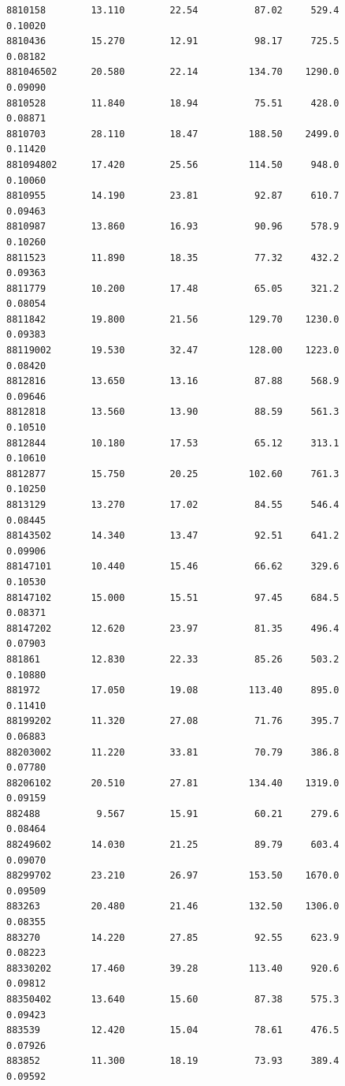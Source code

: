 \documentclass[
  letterpaper,
  DIV=11,
  numbers=noendperiod]{scrartcl}
\begin{document}
\begin{verbatim}
8810158        13.110        22.54          87.02     529.4         0.10020
8810436        15.270        12.91          98.17     725.5         0.08182
881046502      20.580        22.14         134.70    1290.0         0.09090
8810528        11.840        18.94          75.51     428.0         0.08871
8810703        28.110        18.47         188.50    2499.0         0.11420
881094802      17.420        25.56         114.50     948.0         0.10060
8810955        14.190        23.81          92.87     610.7         0.09463
8810987        13.860        16.93          90.96     578.9         0.10260
8811523        11.890        18.35          77.32     432.2         0.09363
8811779        10.200        17.48          65.05     321.2         0.08054
8811842        19.800        21.56         129.70    1230.0         0.09383
88119002       19.530        32.47         128.00    1223.0         0.08420
8812816        13.650        13.16          87.88     568.9         0.09646
8812818        13.560        13.90          88.59     561.3         0.10510
8812844        10.180        17.53          65.12     313.1         0.10610
8812877        15.750        20.25         102.60     761.3         0.10250
8813129        13.270        17.02          84.55     546.4         0.08445
88143502       14.340        13.47          92.51     641.2         0.09906
88147101       10.440        15.46          66.62     329.6         0.10530
88147102       15.000        15.51          97.45     684.5         0.08371
88147202       12.620        23.97          81.35     496.4         0.07903
881861         12.830        22.33          85.26     503.2         0.10880
881972         17.050        19.08         113.40     895.0         0.11410
88199202       11.320        27.08          71.76     395.7         0.06883
88203002       11.220        33.81          70.79     386.8         0.07780
88206102       20.510        27.81         134.40    1319.0         0.09159
882488          9.567        15.91          60.21     279.6         0.08464
88249602       14.030        21.25          89.79     603.4         0.09070
88299702       23.210        26.97         153.50    1670.0         0.09509
883263         20.480        21.46         132.50    1306.0         0.08355
883270         14.220        27.85          92.55     623.9         0.08223
88330202       17.460        39.28         113.40     920.6         0.09812
88350402       13.640        15.60          87.38     575.3         0.09423
883539         12.420        15.04          78.61     476.5         0.07926
883852         11.300        18.19          73.93     389.4         0.09592

\end{verbatim}
\end{document}
